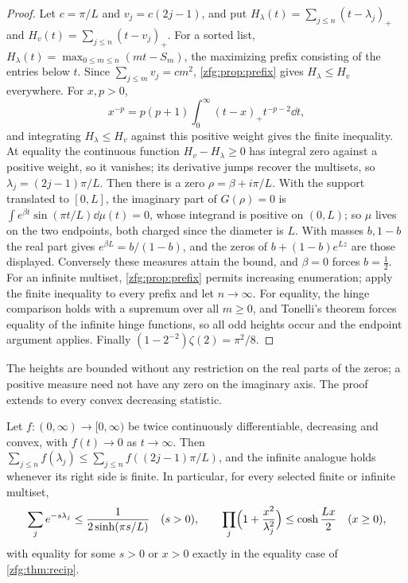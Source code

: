 \begin{proof}
Let $c=\pi/L$ and $v_j=c(2j-1)$, and put $H_\lambda(t)=\sum_{j\le n}(t-\lambda_j)_+$ and $H_v(t)=\sum_{j\le n}(t-v_j)_+$. For a sorted list,
$H_\lambda(t)=\max_{0\le m\le n}(mt-S_m)$, the maximizing prefix consisting of the entries below $t$. Since $\sum_{j\le m}v_j=cm^2$,
\cref{zfg:prop:prefix} gives $H_\lambda\le H_v$ everywhere. For $x,p>0$,
\[
 x^{-p}=p(p+1)\int_0^\infty(t-x)_+t^{-p-2}\dd t,
\]
and integrating $H_\lambda\le H_v$ against this positive weight gives the finite inequality. At equality the continuous
function $H_v-H_\lambda\ge0$ has integral zero against a positive weight, so it vanishes; its derivative jumps recover the
multisets, so $\lambda_j=(2j-1)\pi/L$. Then there is a zero $\rho=\beta+i\pi/L$. With the support translated to $[0,L]$, the
imaginary part of $G(\rho)=0$ is $\int e^{\beta t}\sin(\pi t/L)\dd\mu(t)=0$, whose integrand is positive on $(0,L)$; so $\mu$ lives on
the two endpoints, both charged since the diameter is $L$. With masses $b,1-b$ the real part gives $e^{\beta L}=b/(1-b)$, and the
zeros of $b+(1-b)e^{Lz}$ are those displayed. Conversely these measures attain the bound, and $\beta=0$ forces $b=\tfrac12$.
For an infinite multiset, \cref{zfg:prop:prefix} permits increasing enumeration; apply the finite inequality to every
prefix and let $n\to\infty$. For equality, the hinge comparison holds with a supremum over all $m\ge0$, and Tonelli's
theorem forces equality of the infinite hinge functions, so all odd heights occur and the endpoint argument applies.
Finally $(1-2^{-2})\zeta(2)=\pi^2/8$.
\end{proof}

The heights are bounded without any restriction on the real parts of the zeros; a positive measure need not have
any zero on the imaginary axis. The proof extends to every convex decreasing statistic.

\begin{corollary}\label{zfg:cor:convex}
Let $f:(0,\infty)\to[0,\infty)$ be twice continuously differentiable, decreasing and convex, with $f(t)\to0$ as $t\to\infty$.
Then $\sum_{j\le n}f(\lambda_j)\le\sum_{j\le n}f((2j-1)\pi/L)$, and the infinite analogue holds whenever its right side is finite.
In particular, for every selected finite or infinite multiset,
\[
 \sum_je^{-s\lambda_j}\le\frac1{2\sinh(\pi s/L)}\quad(s>0),\qquad \prod_j\Bigl(1+\frac{x^2}{\lambda_j^2}\Bigr)\le\cosh\frac{Lx}2\quad(x\ge0),
\]
with equality for some $s>0$ or $x>0$ exactly in the equality case of \cref{zfg:thm:recip}.
\end{corollary}

